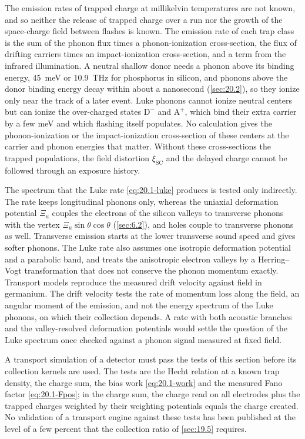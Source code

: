 The emission rates of trapped charge at millikelvin temperatures are not known, and so neither the release of trapped charge over a run nor the growth of the space-charge field between flashes is known. The emission rate of each trap class is the sum of the phonon flux times a phonon-ionization cross-section, the flux of drifting carriers times an impact-ionization cross-section, and a term from the infrared illumination. A neutral shallow donor needs a phonon above its binding energy, \SI{45}{meV} or \SI{10.9}{THz} for phosphorus in silicon, and phonons above the donor binding energy decay within about a nanosecond (\cref{sec:20.2}), so they ionize only near the track of a later event. Luke phonons cannot ionize neutral centers but can ionize the over-charged states $\mathrm{D}^-$ and $\mathrm{A}^+$, which bind their extra carrier by a few meV and which flashing itself populates. No calculation gives the phonon-ionization or the impact-ionization cross-section of these centers at the carrier and phonon energies that matter. Without these cross-sections the trapped populations, the field distortion $\xi_{\mathrm{SC}}$ and the delayed charge cannot be followed through an exposure history.

The spectrum that the Luke rate \cref{eq:20.1-luke} produces is tested only indirectly. The rate keeps longitudinal phonons only, whereas the uniaxial deformation potential $\Xi_u$ couples the electrons of the silicon valleys to transverse phonons with the vertex $\Xi_u\sin\theta\cos\theta$ (\cref{sec:6.2}), and holes couple to transverse phonons as well. Transverse emission starts at the lower transverse sound speed and gives softer phonons. The Luke rate also assumes one isotropic deformation potential and a parabolic band, and treats the anisotropic electron valleys by a Herring--Vogt transformation that does not conserve the phonon momentum exactly. Transport models reproduce the measured drift velocity against field in germanium. The drift velocity tests the rate of momentum loss along the field, an angular moment of the emission, and not the energy spectrum of the Luke phonons, on which their collection depends. A rate with both acoustic branches and the valley-resolved deformation potentials would settle the question of the Luke spectrum once checked against a phonon signal measured at fixed field.

A transport simulation of a detector must pass the tests of this section before its collection kernels are used. The tests are the Hecht relation at a known trap density, the charge sum, the bias work \cref{eq:20.1-work} and the measured Fano factor \cref{eq:20.1-Fpos}; in the charge sum, the charge read on all electrodes plus the trapped charges weighted by their weighting potentials equals the charge created. No validation of a transport engine against these tests has been published at the level of a few percent that the collection ratio of \cref{sec:19.5} requires.
